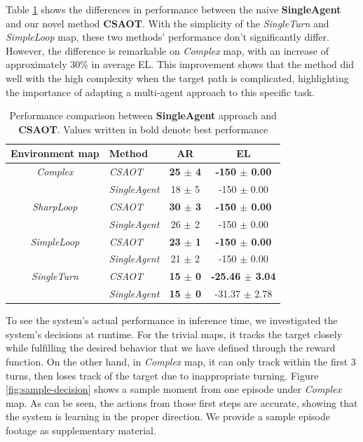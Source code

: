 \documentclass[sigconf]{aamas}
\begin{document}
Table \ref{tab:comparison} shows the differences in performance between the naive \textbf{SingleAgent} and our novel method \textbf{CSAOT}. With the simplicity of the \textit{SingleTurn} and \textit{SimpleLoop} map, these two methods' performance don't significantly differ. However, the difference is remarkable on \textit{Complex} map, with an increase of approximately 30$\%$ in average EL. This improvement shows that the method did well with the high complexity when the target path is complicated, highlighting the importance of adapting a multi-agent approach to this specific task.
\begin{table}[h!]
    \centering
    \begin{tabular}{|c|l|c|c|}
        \hline
        \textbf{Environment map} & \textbf{Method} & \textbf{AR} & \textbf{EL} \\
        \hline
        \textit{Complex} &\textit{CSAOT} & \textbf{25 $\pm$ 4} & \textbf{-150 $\pm$ 0.00} \\
        & \textit{SingleAgent} & 18 $\pm$ 5 & -150 $\pm$ 0.00  \\
        \hline
        \textit{SharpLoop} &\textit{CSAOT} & \textbf{30 $\pm$ 3} & \textbf{-150 $\pm$ 0.00} \\
        & \textit{SingleAgent} & 26 $\pm$ 2 & -150 $\pm$ 0.00  \\
        \hline
        \textit{SimpleLoop} &\textit{CSAOT} & \textbf{23 $\pm$ 1} & \textbf{-150 $\pm$ 0.00} \\
        & \textit{SingleAgent} & 21 $\pm$ 2 & -150 $\pm$ 0.00 \\
        \hline
        \textit{SingleTurn} & \textit{CSAOT} & \textbf{15 $\pm$ 0} & \textbf{-25.46 $\pm$ 3.04} \\
        & \textit{SingleAgent} & \textbf{15 $\pm$ 0} & -31.37 $\pm$ 2.78 \\
        \hline
    \end{tabular}
    \caption{Performance comparison between \textbf{SingleAgent} approach and \textbf{CSAOT}. Values written in bold denote best performance}
    \label{tab:comparison}
\end{table}

To see the system's actual performance in inference time, we investigated the system's decisions at runtime. For the trivial maps, it tracks the target closely while fulfilling the desired behavior that we have defined through the reward function. On the other hand, in \textit{Complex} map, it can only track within the first 3 turns, then loses track of the target due to inappropriate turning. Figure \ref{fig:sample-decision} shows a sample moment from one episode under \textit{Complex} map. As can be seen, the actions from those first steps are accurate, showing that the system is learning in the proper direction. We provide a sample episode footage as supplementary material.
\end{document}
